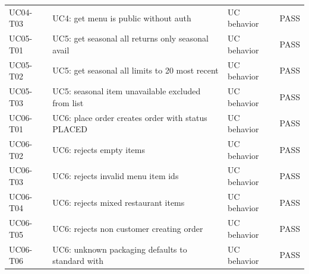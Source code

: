 \begin{table}[t]
\begin{tabular}{p{3.8cm}p{3.6cm}p{2.8cm}p{2.0cm}}
UC04-T03 & UC4: get menu is public without auth & UC behavior & PASS \\
UC05-T01 & UC5: get seasonal all returns only seasonal avail & UC behavior & PASS \\
UC05-T02 & UC5: get seasonal all limits to 20 most recent & UC behavior & PASS \\
UC05-T03 & UC5: seasonal item unavailable excluded from list & UC behavior & PASS \\
UC06-T01 & UC6: place order creates order with status PLACED & UC behavior & PASS \\
UC06-T02 & UC6: rejects empty items & UC behavior & PASS \\
UC06-T03 & UC6: rejects invalid menu item ids & UC behavior & PASS \\
UC06-T04 & UC6: rejects mixed restaurant items & UC behavior & PASS \\
UC06-T05 & UC6: rejects non customer creating order & UC behavior & PASS \\
UC06-T06 & UC6: unknown packaging defaults to standard with  & UC behavior & PASS \\
\bottomrule
\end{tabular}
\end{table}

